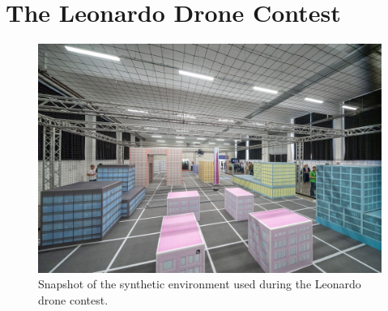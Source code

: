 \section{The Leonardo Drone Contest}%
\label{SEC:DRONE-CONTEST}
\begin{figure}[!t]
	\centering
	\includegraphics[width=1.\textwidth]{Figs/Chapter1/leonardo_map.jpg}
	\caption{Snapshot of the synthetic environment used during the Leonardo drone contest.}
	\label{FIG:LEONARDO-MAP}
\end{figure}

